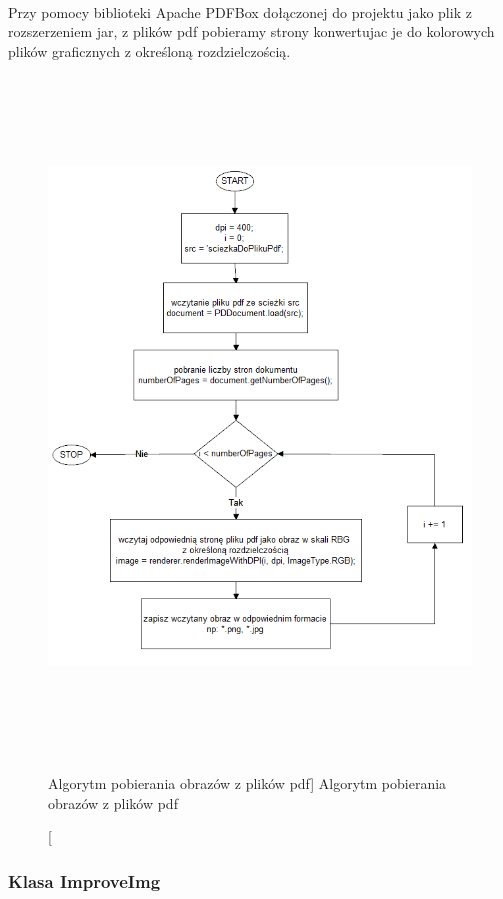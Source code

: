 \documentclass[a4paper,12pt]{article}
\begin{document}
		\paragraph{} Przy pomocy biblioteki Apache PDFBox do\l ączonej do projektu jako plik z rozszerzeniem jar, z plików pdf pobieramy strony konwertujac je do kolorowych plików graficznych z określoną rozdzielczością.

        \newpage
        
		\begin{figure}[!ht]  
			\begin{center}
				\includegraphics[width=15cm, height=18cm] {image//algorithm//getImgFromPdf.png} 
			\end{center}
			\caption
    			[Algorytm pobierania obrazów z plików pdf]  
	    		{Algorytm pobierania obrazów z plików pdf}  
		\end{figure}
		
		\subsubsection{Klasa ImproveImg}
\end{document}
